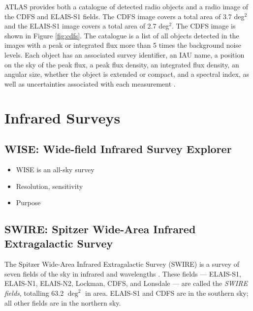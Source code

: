             ATLAS provides both a catalogue of detected radio objects and a
            radio image of the CDFS and ELAIS-S1 fields. The CDFS image covers a
            total area of 3.7 deg$^2$ and the ELAIS-S1 image covers a total area
            of 2.7 deg$^2$. The CDFS image is shown in Figure \ref{fig:cdfs}.
            The catalogue is a list of all objects detected in the images with a
            peak or integrated flux more than 5 times the background noise
            levels. Each object has an associated survey identifier, an IAU
            name, a position on the sky of the peak flux, a peak flux density,
            an integrated flux density, an angular size, whether the object is
            extended or compact, and a spectral index, as well as uncertainties
            associated with each measurement \citep{franzen15}.

    \section{Infrared Surveys}
    \label{sec:infrared-surveys}

        \subsection{WISE: Wide-field Infrared Survey Explorer}
        \label{sec:wise}

            \begin{itemize}
                \item WISE is an all-sky survey
                \item Resolution, sensitivity
                \item Purpose
            \end{itemize}

        \subsection{SWIRE: Spitzer Wide-Area Infrared Extragalactic Survey}
        \label{sec:swire}

            The Spitzer Wide-Area Infrared Extragalactic Survey (SWIRE) is a survey of seven fields of the sky in infrared and wavelengths \citep{lonsdale03}. These fields --- ELAIS-S1, ELAIS-N1, ELAIS-N2, Lockman, CDFS, and Lonsdale --- are called the \emph{SWIRE fields}, totalling 63.2 $\deg^2$ in area. ELAIS-S1 and CDFS are in the southern sky; all other fields are in the northern sky.

